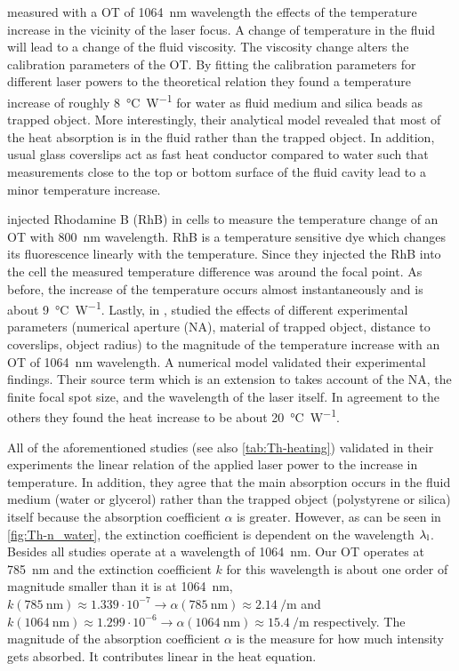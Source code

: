  measured with a OT of \SI{1064}{\nm} wavelength the 
effects of the temperature increase in the vicinity of the laser focus. A 
change of temperature in the fluid will lead to a change of the fluid 
viscosity. The viscosity change alters the calibration parameters of the OT. By 
fitting the calibration parameters for different laser powers to the 
theoretical relation they found a temperature increase of roughly 
\SI{8}{\degreeCelsius\per\watt} for water as fluid medium and silica beads as 
trapped object. More interestingly, their analytical model revealed that most 
of the heat absorption is in the fluid rather than the trapped object. In 
addition, usual glass coverslips act as fast heat conductor compared to water 
such that measurements close to the top or bottom surface of the fluid cavity 
lead to a minor temperature increase.

 injected Rhodamine B (RhB) in cells to measure the 
temperature change of an OT with \SI{800}{\nm} wavelength. RhB is a temperature 
sensitive dye which changes its fluorescence linearly with the temperature. 
Since they injected the RhB into the cell the measured temperature difference 
was around the focal point. As before, the increase of the temperature occurs 
almost instantaneously and is about \SI{9}{\degreeCelsius\per\watt}. Lastly, in 
\citeyear{Catala2017},  studied the effects of different 
experimental parameters (numerical aperture (NA), material of trapped object, 
distance to coverslips, object radius) to the magnitude of the temperature 
increase with an OT of \SI{1064}{\nm} wavelength. A numerical model validated 
their experimental findings. Their source term which is an extension to 
 takes account of the NA, the finite focal spot size, and 
the wavelength of the laser itself. In agreement to the others they found the 
heat increase to be about \SI{20}{\degreeCelsius\per\watt}.

All of the aforementioned studies (see also \cref{tab:Th-heating}) validated in 
their experiments the linear relation of the applied laser power to the 
increase in temperature. In addition, they agree that the main absorption 
occurs in the fluid medium (water or glycerol) rather than the trapped object 
(polystyrene or silica) itself because the absorption coefficient $\alpha$ is 
greater. However, as can be seen in \cref{fig:Th-n_water}, the extinction 
coefficient is dependent on the wavelength $\lambda_{\mathrm{l}}$. Besides \cite{Moreau2015} 
all studies operate at a wavelength of \SI{1064}{\nm}. Our OT operates at 
\SI{785}{\nm} and the extinction coefficient $k$ for this wavelength is about 
one order of magnitude smaller than it is at \SI{1064}{\nm},
$k(\SI{785}{\nm}) \approx 1.339\cdot 10^{-7} \rightarrow \alpha(\SI{785}{\nm}) 
\approx \SI{2.14}{\per\meter} $ and $k(\SI{1064}{\nm}) \approx 1.299\cdot 
10^{-6} \rightarrow \alpha(\SI{1064}{\nm}) \approx \SI{15.4}{\per\meter} $ 
respectively. The magnitude of the absorption coefficient $\alpha$ is the 
measure for how much intensity gets absorbed. It contributes linear in the heat 
equation.

